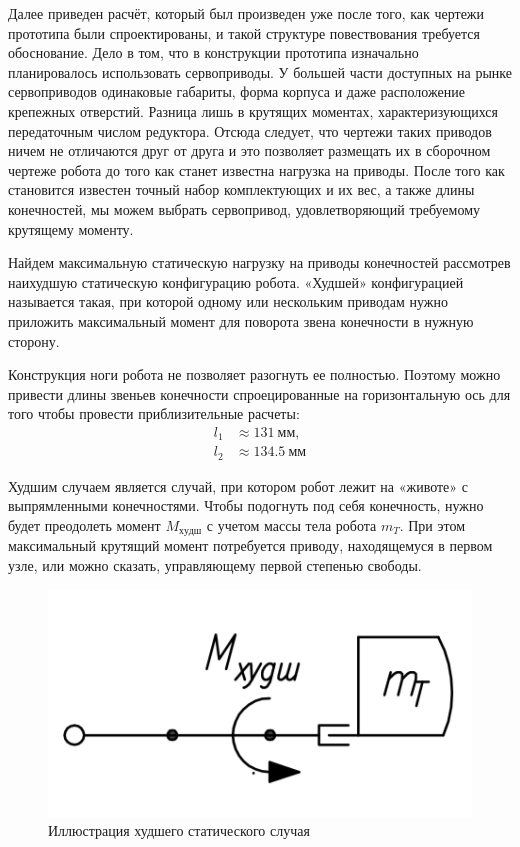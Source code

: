 Далее приведен расчёт, который был произведен уже после того, как чертежи прототипа были спроектированы, и такой структуре повествования требуется обоснование. Дело в том, что в конструкции прототипа изначально планировалось использовать сервоприводы. У большей части доступных на рынке сервоприводов одинаковые габариты, форма корпуса и даже расположение крепежных отверстий. Разница лишь в крутящих моментах, характеризующихся передаточным числом редуктора. Отсюда следует, что чертежи таких приводов ничем не отличаются друг от друга и это позволяет размещать их в сборочном чертеже робота до того как станет известна нагрузка на приводы. После того как становится известен точный набор комплектующих и их вес, а также длины конечностей, мы можем выбрать сервопривод, удовлетворяющий требуемому крутящему моменту.

Найдем максимальную статическую нагрузку на приводы конечностей рассмотрев наихудшую статическую конфигурацию робота. «Худшей» конфигурацией называется такая, при которой одному или нескольким приводам нужно приложить максимальный момент для поворота звена конечности в нужную сторону.

Конструкция ноги робота не позволяет разогнуть ее полностью. Поэтому можно привести длины звеньев конечности спроецированные на горизонтальную ось для того чтобы провести приблизительные расчеты:
\begin{align*}
    l_1 &\approx 131\: мм, \\
    l_2 &\approx 134.5\: мм
\end{align*}

Худшим случаем является случай, при котором робот лежит на «животе» с выпрямленными конечностями. Чтобы подогнуть под себя конечность, нужно будет преодолеть момент $M_{худш}$ с учетом массы тела робота $m_T$. При этом максимальный крутящий момент потребуется приводу, находящемуся в первом узле, или можно сказать, управляющему первой степенью свободы.

\begin{figure}[ht]
    \centering
    \includegraphics[scale=1]{kin2.png}
    \caption{Иллюстрация худшего статического случая}
\end{figure}

